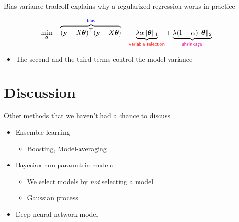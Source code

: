\documentclass[
  ignorenonframetext,
  aspectratio=169]{beamer}
\providecommand{\tightlist}{%
  \setlength{\itemsep}{0pt}\setlength{\parskip}{0pt}}
\begin{document}
\begin{frame}{Bias-variance tradeoff explains why a regularized
regression works in practice}
\protect\hypertarget{bias-variance-tradeoff-explains-why-a-regularized-regression-works-in-practice}{}
\large

\[
\min_{\boldsymbol{\theta}} \quad
\overbrace{(\mathbf{y} - X\boldsymbol{\theta})^{\top}(\mathbf{y} - X\boldsymbol{\theta})}^{\textsf{\color{blue} bias}} + \underbrace{\lambda \alpha \|\boldsymbol{\theta}\|_{1}}_{\textsf{\color{red} variable selection}} + \underbrace{\lambda (1 - \alpha) \|\boldsymbol{\theta}\|_{2}}_{\textsf{\color{magenta} shrinkage}}
\]

\begin{itemize}
\tightlist
\item
  The second and the third terms control the model variance
\end{itemize}
\end{frame}

\hypertarget{discussion}{%
\section{Discussion}\label{discussion}}

\begin{frame}{Other methods that we haven't had a chance to discuss}
\protect\hypertarget{other-methods-that-we-havent-had-a-chance-to-discuss}{}
\begin{itemize}
\item
  Ensemble learning

  \begin{itemize}
  \tightlist
  \item
    Boosting, Model-averaging
  \end{itemize}
\item
  Bayesian non-parametric models

  \begin{itemize}
  \item
    We select models by \emph{not} selecting a model
  \item
    Gaussian process
  \end{itemize}
\item
  Deep neural network model
\end{itemize}
\end{frame}
\end{document}
